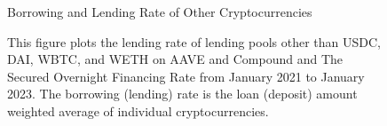 \clearpage
\newpage
\begin{figure}[ht!]
\centering
\caption{Borrowing and Lending Rate of Other Cryptocurrencies }\label{fig:defi_interestrate_others}
\caption*{This figure plots the lending rate of lending pools other than USDC, DAI, WBTC, and WETH on AAVE and Compound and The Secured Overnight Financing Rate from January 2021 to January 2023. The borrowing (lending) rate is the loan (deposit) amount weighted average of individual cryptocurrencies.}



\end{figure}
\clearpage
\newpage


